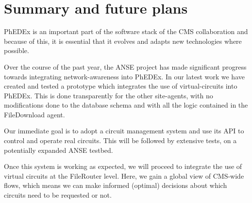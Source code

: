 \section{Summary and future plans}

PhEDEx is an important part of the software stack of the CMS collaboration and
because of this, it is essential that it evolves and adapts new technologies 
where possible. 

Over the course of the past year, the ANSE project has made significant progress
towards integrating network-awareness into PhEDEx. In our latest work we have
created and tested a prototype which integrates the use of virtual-circuits into
PhEDEx. This is done transparently for the other site-agents, with no modifications
done to the database schema and with all the logic contained in the FileDownload
agent.

Our immediate goal is to adopt a circuit management system and use its API to
control and operate real circuits. This will be followed by extensive tests, on 
a potentially expanded ANSE testbed.

Once this system is working as expected, we will proceed to integrate the use
of virtual circuits at the FileRouter level. Here, we gain a global view of 
CMS-wide flows, which means we can make informed (optimal) decisions about which 
circuits need to be requested or not.
